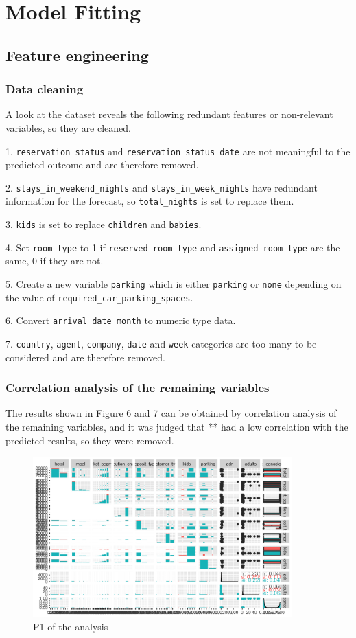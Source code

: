 \documentclass{article}
\begin{document}
\section{Model Fitting}

\subsection{Feature engineering}

\subsubsection{Data cleaning}

A look at the dataset reveals the following redundant features or non-relevant variables, so they are cleaned.

1. \verb|reservation_status| and \verb|reservation_status_date| are not meaningful to the predicted outcome and are therefore removed.

2. \verb|stays_in_weekend_nights| and \verb|stays_in_week_nights| have redundant information for the forecast, so \verb|total_nights| is set to replace them.

3. \verb|kids| is set to replace \verb|children| and \verb|babies|.

4. Set \verb|room_type| to 1 if \verb|reserved_room_type| and \verb|assigned_room_type| are the same, 0 if they are not.

5. Create a new variable \verb|parking| which is either \verb|parking| or \verb|none| depending on the value of \verb|required_car_parking_spaces|.

6. Convert \verb|arrival_date_month| to numeric type data.

7. \verb|country|, \verb|agent|, \verb|company|, \verb|date| and \verb|week| categories are too many to be considered and are therefore removed.


\subsubsection{Correlation analysis of the remaining variables}

The results shown in Figure 6 and 7 can be obtained by correlation analysis of the remaining variables, and it was judged that ** had a low correlation with the predicted results, so they were removed.

\begin{figure}[h]
\centering
\includegraphics[width=10cm]{remain1.png} %
\caption{P1 of the analysis} %
\end{figure}
\end{document}
